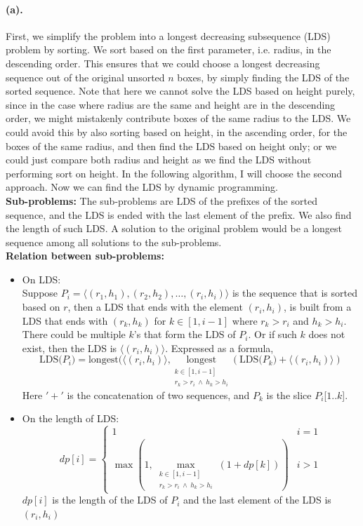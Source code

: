 \documentclass[12pt]{article}
\begin{document}
\paragraph{(a).}
First, we simplify the problem into a longest decreasing subsequence (LDS) problem by sorting. We sort based on the first parameter, i.e. radius, in the descending order. This ensures that we could choose a longest decreasing sequence out of the original unsorted \(n\) boxes, by simply finding the LDS of the sorted sequence. Note that here we cannot solve the LDS based on height purely, since in the case where radius are the same and height are in the descending order, we might mistakenly contribute boxes of the same radius to the LDS. We could avoid this by also sorting based on height, in the ascending order, for the boxes of the same radius, and then find the LDS based on height only; or we could just compare both radius and height as we find the LDS without performing sort on height. In the following algorithm, I will choose the second approach.
Now we can find the LDS by dynamic programming. \\
\textbf{Sub-problems:} The sub-problems are LDS of the prefixes of the sorted sequence, and the LDS is ended with the last element of the prefix. We also find the length of such LDS. A solution to the original problem would be a longest sequence among all solutions to the sub-problems.\\
\textbf{Relation between sub-problems:}
\begin{itemize}
     \setlength \itemsep{0em} 
     \item On LDS:\\
     Suppose \(P_i = \langle(r_1,h_1), (r_2, h_2), \hdots, (r_i, h_i)\rangle\) is the sequence that is sorted based on \(r\), then a LDS that ends with the element \((r_i, h_i)\), is built from a LDS that ends with \((r_k, h_k)\) for \(k \in [1, i-1]\) where \(r_k > r_i\) and \(h_k > h_i\). There could be multiple \(k\)'s that form the LDS of \(P_i\). Or if such \(k\) does not exist, then the LDS is \(\langle(r_i, h_i)\rangle\). Expressed as a formula, 
     \begin{equation*}
          \text{LDS(\(P_i\))} = \text{longest}(\langle(r_i, h_i)\rangle, \underset{\substack{k \in [1, i-1] \\ r_k > r_i\ \land\ h_k > h_i}}{\text{longest}}(\text{LDS(\(P_k\))} + \langle(r_i, h_i)\rangle)
     \end{equation*}
   Here \('+'\) is the concatenation of two sequences, and \(P_k\) is the slice \(P_i\)[\(1 .. k\)].
     \item On the length of LDS:
     \begin{equation*}
          dp[i] = 
          \begin{cases}
               1 & i = 1 \\
               \max (1, \displaystyle\max_{\substack{k \in [1, i-1] \\ r_k > r_i\ \land\ h_k > h_i}}(1 + dp[k])) & i > 1
          \end{cases}
     \end{equation*}
     \(dp[i]\) is the length of the LDS of \(P_i\) and the last element of the LDS is \((r_i, h_i)\)
\end{itemize}
 
\end{document}
